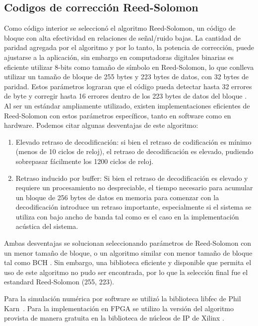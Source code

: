\subsection{Codigos de corrección Reed-Solomon}
Como código interior se seleccionó el algoritmo Reed-Solomon, un código de bloque con alta efectividad en relaciones de señal/ruido bajas. La cantidad de paridad agregada por el algoritmo y por lo tanto, la potencia de corrección, puede ajustarse a la aplicación, sin embargo en computadoras digitales binarias es eficiente utilizar 8-bits como tamaño de símbolo en Reed-Solomon, lo que conlleva utilizar un tamaño de bloque de 255 bytes y 223 bytes de datos, con 32 bytes de paridad. Estos parámetros lograran que el código pueda detectar hasta 32 errores de byte y corregir hasta 16 errores dentro de los 223 bytes de datos del bloque \cite{wicker1999reed}. Al ser un estándar ampliamente utilizado, existen implementaciones eficientes de Reed-Solomon con estos parámetros específicos, tanto en software como en hardware.
Podemos citar algunas desventajas de este algoritmo:
\begin{enumerate}
 \item Elevado retraso de decodificación: si bien el retraso de codificación es mínimo (menos de 10 ciclos de reloj), el retraso de decodificación es elevado, pudiendo sobrepasar fácilmente los 1200 ciclos de reloj.
 \item Retraso inducido por buffer: Si bien el retraso de decodificación es elevado y requiere un procesamiento no despreciable, el tiempo necesario para acumular un bloque de 256 bytes de datos en memoria para comenzar con la decodificación introduce un retraso importante, especialmente si el sistema se utiliza con bajo ancho de banda tal como es el caso en la implementación acústica del sistema.
\end{enumerate}
 
Ambas desventajas se solucionan seleccionando parámetros de Reed-Solomon con un menor tamaño de bloque, o un algoritmo similar con menor tamaño de bloque tal como BCH \cite{bose1960class}. Sin embargo, una biblioteca eficiente
 y disponible que permita el uso de este algoritmo no pudo ser encontrada, por lo que la selección final fue el estandard Reed-Solomon (255, 223).

Para la simulación numérica por software se utilizó la biblioteca libfec de Phil Karn~\cite{libfec}. Para la implementación en FPGA se utilizo la versión del algoritmo provista de manera gratuita en la biblioteca de núcleos de IP de Xilinx \cite{Xilinx:DS251}.

